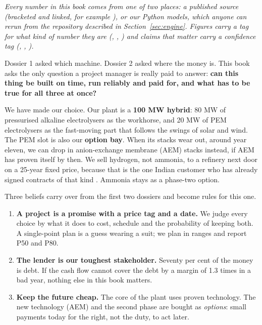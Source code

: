 \vfill
\begin{minipage}{0.92\textwidth}\small\color{ink2}\itshape
Every number in this book comes from one of two places: a published source (bracketed and linked, for example \cite{jmkiocl2025}), or our Python models, which anyone can rerun from the repository described in Section~\ref{sec:engine}. Figures carry a tag for what kind of number they are (\rep, \estd, \prj) and claims that matter carry a confidence tag (\confH, \confM, \confL).
\end{minipage}
\vspace{10mm}
\newpage


Dossier 1 asked which machine. Dossier 2 asked where the money is. This book asks the only question a project manager is really paid to answer: \textbf{can this thing be built on time, run reliably and paid for, and what has to be true for all three at once?}

We have made our choice. Our plant is a \textbf{100 MW hybrid}: 80 MW of pressurised alkaline electrolysers as the workhorse, and 20 MW of PEM electrolysers as the fast-moving part that follows the swings of solar and wind. The PEM slot is also our \textbf{option bay}. When its stacks wear out, around year eleven, we can drop in anion-exchange membrane (AEM) stacks instead, if AEM has proven itself by then. We sell hydrogen, not ammonia, to a refinery next door on a 25-year fixed price, because that is the one Indian customer who has already signed contracts of that kind \cite{jmkiocl2025,rwnrl2026}. Ammonia stays as a phase-two option.

Three beliefs carry over from the first two dossiers and become rules for this one.

\begin{enumerate}[leftmargin=1.6em,label={\color{audit}\display\arabic*}]
\item \textbf{A project is a promise with a price tag and a date.} We judge every choice by what it does to cost, schedule and the probability of keeping both. A single-point plan is a guess wearing a suit; we plan in ranges and report P50 and P80.
\item \textbf{The lender is our toughest stakeholder.} Seventy per cent of the money is debt. If the cash flow cannot cover the debt by a margin of 1.3 times in a bad year, nothing else in this book matters.
\item \textbf{Keep the future cheap.} The core of the plant uses proven technology. The new technology (AEM) and the second phase are bought as \emph{options}: small payments today for the right, not the duty, to act later.
\end{enumerate}

